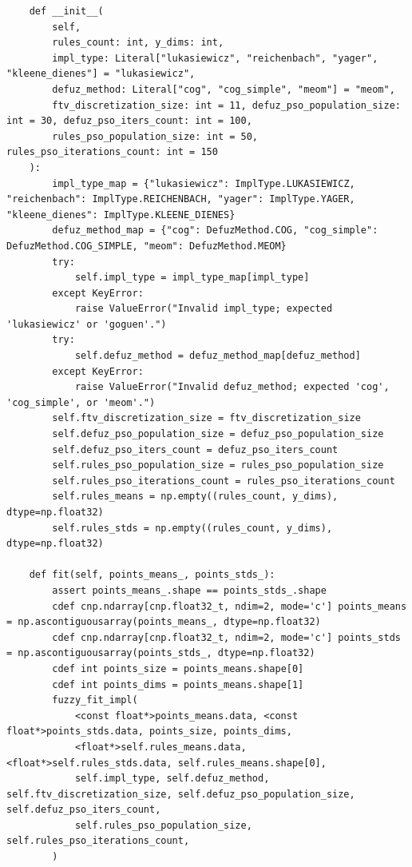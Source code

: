 \begin{verbatim}
    def __init__(
        self,
        rules_count: int, y_dims: int,
        impl_type: Literal["lukasiewicz", "reichenbach", "yager", "kleene_dienes"] = "lukasiewicz",
        defuz_method: Literal["cog", "cog_simple", "meom"] = "meom",
        ftv_discretization_size: int = 11, defuz_pso_population_size: int = 30, defuz_pso_iters_count: int = 100,
        rules_pso_population_size: int = 50, rules_pso_iterations_count: int = 150
    ):
        impl_type_map = {"lukasiewicz": ImplType.LUKASIEWICZ, "reichenbach": ImplType.REICHENBACH, "yager": ImplType.YAGER, "kleene_dienes": ImplType.KLEENE_DIENES}
        defuz_method_map = {"cog": DefuzMethod.COG, "cog_simple": DefuzMethod.COG_SIMPLE, "meom": DefuzMethod.MEOM}
        try:
            self.impl_type = impl_type_map[impl_type]
        except KeyError:
            raise ValueError("Invalid impl_type; expected 'lukasiewicz' or 'goguen'.")
        try:
            self.defuz_method = defuz_method_map[defuz_method]
        except KeyError:
            raise ValueError("Invalid defuz_method; expected 'cog', 'cog_simple', or 'meom'.")
        self.ftv_discretization_size = ftv_discretization_size
        self.defuz_pso_population_size = defuz_pso_population_size
        self.defuz_pso_iters_count = defuz_pso_iters_count
        self.rules_pso_population_size = rules_pso_population_size
        self.rules_pso_iterations_count = rules_pso_iterations_count
        self.rules_means = np.empty((rules_count, y_dims), dtype=np.float32)
        self.rules_stds = np.empty((rules_count, y_dims), dtype=np.float32)

    def fit(self, points_means_, points_stds_):
        assert points_means_.shape == points_stds_.shape
        cdef cnp.ndarray[cnp.float32_t, ndim=2, mode='c'] points_means = np.ascontiguousarray(points_means_, dtype=np.float32)
        cdef cnp.ndarray[cnp.float32_t, ndim=2, mode='c'] points_stds = np.ascontiguousarray(points_stds_, dtype=np.float32)
        cdef int points_size = points_means.shape[0]
        cdef int points_dims = points_means.shape[1]
        fuzzy_fit_impl(
            <const float*>points_means.data, <const float*>points_stds.data, points_size, points_dims,
            <float*>self.rules_means.data, <float*>self.rules_stds.data, self.rules_means.shape[0],
            self.impl_type, self.defuz_method, self.ftv_discretization_size, self.defuz_pso_population_size, self.defuz_pso_iters_count,
            self.rules_pso_population_size, self.rules_pso_iterations_count,
        )


\end{verbatim}
